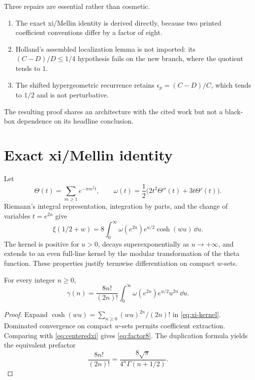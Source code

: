 \documentclass[12pt]{article}
\begin{document}
Three repairs are essential rather than cosmetic.
\begin{enumerate}
\item The exact xi/Mellin identity is derived directly, because two printed
coefficient conventions differ by a factor of eight.
\item Holland's assembled localization lemma is not imported: its
$(C-D)/D\le1/4$ hypothesis fails on the new branch, where the quotient tends
to $1$.
\item The shifted hypergeometric recurrence retains
$\epsilon_p=(C-D)/C$, which tends to $1/2$ and is not perturbative.
\end{enumerate}

The resulting proof shares an architecture with the cited work but not a
black-box dependence on its headline conclusion.

\section{Exact xi/Mellin identity}\label{sec:mellin}

Let
\[
 \Theta(t)=\sum_{m\ge1}e^{-\pi m^2t},\qquad
 \omega(t)=\frac12\bigl(2t^2\Theta''(t)+3t\Theta'(t)\bigr).
\]
Riemann's integral representation, integration by parts, and the change of
variables $t=e^{2u}$ give
\begin{equation}\label{eq:xi-kernel}
 \xi(1/2+w)=8\int_0^\infty
  \omega(e^{2u})e^{u/2}\cosh(wu)\,\dd u.
\end{equation}
The kernel is positive for $u>0$, decays superexponentially as
$u\to+\infty$, and extends to an even full-line kernel by the modular
transformation of the theta function.  These properties justify termwise
differentiation on compact $w$-sets.

\begin{proposition}\label{prop:factor8}
For every integer $n\ge0$,
\begin{equation}\label{eq:factor8}
 \gamma(n)=\frac{8n!}{(2n)!}
 \int_0^\infty\omega(e^{2u})e^{u/2}u^{2n}\,\dd u.
\end{equation}
\end{proposition}

\begin{proof}
Expand $\cosh(wu)=\sum_{n\ge0}(wu)^{2n}/(2n)!$ in
\eqref{eq:xi-kernel}.  Dominated convergence on compact $w$-sets permits
coefficient extraction.  Comparing with \eqref{eq:centeredxi} gives
\eqref{eq:factor8}.  The duplication formula yields the equivalent prefactor
\[
 \frac{8n!}{(2n)!}=\frac{8\sqrt\pi}{4^n\Gamma(n+1/2)}.
\]
\end{proof}
\end{document}
